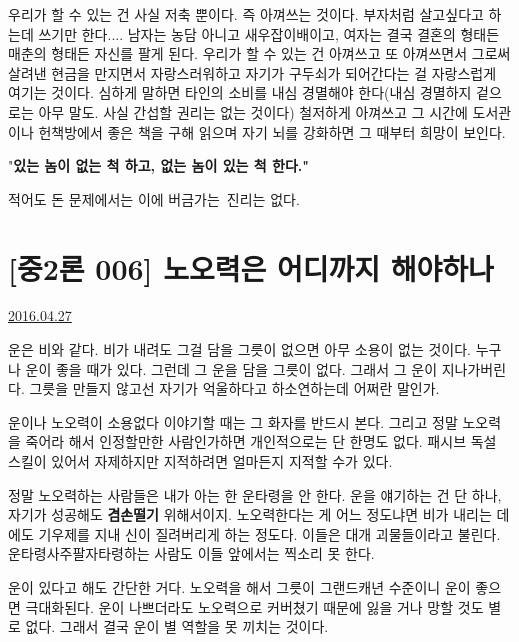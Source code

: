 우리가 할 수 있는 건 사실 저축 뿐이다. 즉 아껴쓰는 것이다.
부자처럼 살고싶다고 하는데 쓰기만 한다.... 남자는 농담 아니고 새우잡이배이고, 여자는 결국 결혼의 형태든 매춘의 형태든 자신를 팔게 된다.
우리가 할 수 있는 건 아껴쓰고 또 아껴쓰면서 그로써 살려낸 현금을 만지면서 자랑스러워하고 자기가 구두쇠가 되어간다는 걸 자랑스럽게 여기는 것이다.
심하게 말하면 타인의 소비를 내심 경멸해야 한다(내심 경멸하지 겉으로는 아무 말도. 사실 간섭할 권리는 없는 것이다)
철저하게 아껴쓰고 그 시간에 도서관이나 헌책방에서 좋은 책을 구해 읽으며 자기 뇌를 강화하면 그 때부터 희망이 보인다.
\vspace{5mm}

"\textbf{있는 놈이 없는 척 하고, 없는 놈이 있는 척 한다."}
\vspace{5mm}

적어도 돈 문제에서는 이에 버금가는 진리는 없다.
\vspace{5mm}








\section{[중2론 006] 노오력은 어디까지 해야하나}
\href{https://www.kockoc.com/Apoc/748594}{2016.04.27}

\vspace{5mm}

운은 비와 같다.
비가 내려도 그걸 담을 그릇이 없으면 아무 소용이 없는 것이다.
누구나 운이 좋을 때가 있다. 그런데 그 운을 담을 그릇이 없다. 그래서 그 운이 지나가버린다.
그릇을 만들지 않고선 자기가 억울하다고 하소연하는데 어쩌란 말인가.
\vspace{5mm}

운이나 노오력이 소용없다 이야기할 때는 그 화자를 반드시 본다.
그리고 정말 노오력을 죽어라 해서 인정할만한 사람인가하면 개인적으로는 단 한명도 없다.
패시브 독설 스킬이 있어서 자제하지만 지적하려면 얼마든지 지적할 수가 있다.
\vspace{5mm}

정말 노오력하는 사람들은 내가 아는 한 운타령을 안 한다. 운을 얘기하는 건 단 하나, 자기가 성공해도 \textbf{겸손떨기} 위해서이지.
노오력한다는 게 어느 정도냐면 비가 내리는 데에도 기우제를 지내 신이 질려버리게 하는 정도다.
이들은 대개 괴물들이라고 불린다. 운타령사주팔자타령하는 사람도 이들 앞에서는 찍소리 못 한다.
\vspace{5mm}

운이 있다고 해도 간단한 거다. 노오력을 해서 그릇이 그랜드캐년 수준이니 운이 좋으면 극대화된다.
운이 나쁘더라도 노오력으로 커버쳤기 때문에 잃을 거나 망할 것도 별로 없다. 그래서 결국 운이 별 역할을 못 끼치는 것이다.
\vspace{5mm}

